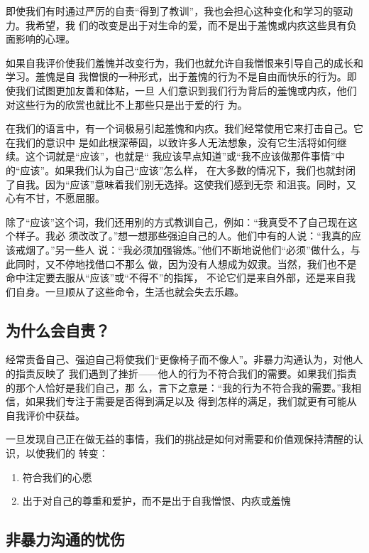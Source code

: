 \documentclass{ctexart}
\begin{document}
即使我们有时通过严厉的自责``得到了教训''，我也会担心这种变化和学习的驱动力。我希望，我
们的改变是出于对生命的爱，而不是出于羞愧或内疚这些具有负面影响的心理。

如果自我评价使我们羞愧并改变行为，我们也就允许自我憎恨来引导自己的成长和学习。羞愧是自
我憎恨的一种形式，出于羞愧的行为不是自由而快乐的行为。即使我们试图更加友善和体贴，一旦
人们意识到我们行为背后的羞愧或内疚，他们对这些行为的欣赏也就比不上那些只是出于爱的行
为。

在我们的语言中，有一个词极易引起羞愧和内疚。我们经常使用它来打击自己。它在我们的意识中
是如此根深蒂固，以致许多人无法想象，没有它生活将如何继续。这个词就是``应该''，也就是``
我应该早点知道''或``我不应该做那件事情''中的``应该''。如果我们认为自己``应该''怎么样，
在大多数的情况下，我们也就封闭了自我。因为``应该''意味着我们别无选择。这使我们感到无奈
和沮丧。同时，又心有不甘，不愿屈服。

除了``应该''这个词，我们还用别的方式教训自己，例如：``我真受不了自己现在这个样子。我必
须改改了。''想一想那些强迫自己的人。他们中有的人说：``我真的应该戒烟了。''另一些人
说：``我必须加强锻炼。''他们不断地说他们``必须''做什么，与此同时，又不停地找借口不那么
做，因为没有人想成为奴隶。当然，我们也不是命中注定要去服从``应该''或``不得不''的指挥，
不论它们是来自外部，还是来自我们自身。一旦顺从了这些命令，生活也就会失去乐趣。


\subsection{为什么会自责？}

经常责备自己、强迫自己将使我们``更像椅子而不像人''。非暴力沟通认为，对他人的指责反映了
我们遇到了挫折------他人的行为不符合我们的需要。如果我们指责的那个人恰好是我们自己，那
么，言下之意是：``我的行为不符合我的需要。''我相信，如果我们专注于需要是否得到满足以及
得到怎样的满足，我们就更有可能从自我评价中获益。

一旦发现自己正在做无益的事情，我们的挑战是如何对需要和价值观保持清醒的认识，以使我们的
转变：

\begin{enumerate}[label=(\arabic*)]
	\item 符合我们的心愿
	\item 出于对自己的尊重和爱护，而不是出于自我憎恨、内疚或羞愧
\end{enumerate}


\subsection{非暴力沟通的忧伤}
\end{document}
